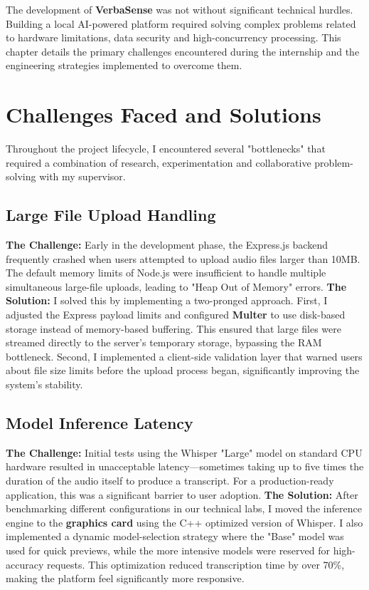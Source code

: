 \documentclass[oneside]{thesis-library}
\begin{document}
The development of \textbf{VerbaSense} was not without significant technical hurdles. Building a local AI-powered platform required solving complex problems related to hardware limitations, data security and high-concurrency processing. This chapter details the primary challenges encountered during the internship and the engineering strategies implemented to overcome them.
\section{Challenges Faced and Solutions}
Throughout the project lifecycle, I encountered several "bottlenecks" that required a combination of research, experimentation and collaborative problem-solving with my supervisor.
\subsection{Large File Upload Handling}
\textbf{The Challenge:} Early in the development phase, the Express.js backend frequently crashed when users attempted to upload audio files larger than 10MB. The default memory limits of Node.js were insufficient to handle multiple simultaneous large-file uploads, leading to "Heap Out of Memory" errors.
\textbf{The Solution:} I solved this by implementing a two-pronged approach. First, I adjusted the Express payload limits and configured \textbf{Multer} to use disk-based storage instead of memory-based buffering. This ensured that large files were streamed directly to the server's temporary storage, bypassing the RAM bottleneck. Second, I implemented a client-side validation layer that warned users about file size limits before the upload process began, significantly improving the system's stability.
\subsection{Model Inference Latency}
\textbf{The Challenge:} Initial tests using the Whisper "Large" model on standard CPU hardware resulted in unacceptable latency—sometimes taking up to five times the duration of the audio itself to produce a transcript. For a production-ready application, this was a significant barrier to user adoption.
\textbf{The Solution:} After benchmarking different configurations in our technical labs, I moved the inference engine to the \textbf{graphics card} using the C++ optimized version of Whisper. I also implemented a dynamic model-selection strategy where the "Base" model was used for quick previews, while the more intensive models were reserved for high-accuracy requests. This optimization reduced transcription time by over 70\%, making the platform feel significantly more responsive.
\end{document}
